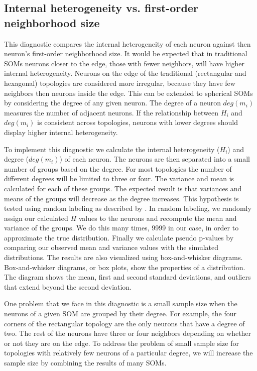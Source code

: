 \subsection{Internal heterogeneity vs. first-order neighborhood size}
\label{q1}
This diagnostic compares the internal heterogeneity of each neuron against
then neuron's first-order neighborhood size.  It would be expected that in
traditional SOMs neurons closer to the edge, those with fewer neighbors, will
have higher internal heterogeneity. Neurons on the edge of the traditional
(rectangular and hexagonal) topologies are considered more irregular, because
they have few neighbors then neurons inside the edge.  This can be extended to
spherical SOMs by considering the degree of any given neuron.  The degree of a
neuron $deg(m_i)$ measures the number of adjacent neurons.  If the
relationship between $H_i$ and $deg(m_i)$ is consistent across topologies,
neurons with lower degrees should display higher internal heterogeneity.

To implement this diagnostic we calculate the internal heterogeneity ($H_i$)
and degree ($deg(m_i)$) of each neuron. The neurons are then separated into a small number of
groups based on the degree.  For most topologies the number of
different degrees will be limited to three or four.  The variance and mean
is calculated for each of these groups.  The expected result is that
variances and means of the groups will decrease as the degree increases.  This
hypothesis is tested using random labeling as described by \cite{siss2004}.
In random labeling, we randomly assign our calculated $H$ values to the
neurons and recompute the mean and variance of the groups.  We do this many times,
9999 in our case, in order to approximate the true distribution. Finally we
calculate pseudo p-values by comparing our observed mean and variance values
with the simulated distributions.  The results are also visualized using
box-and-whisker diagrams. Box-and-whisker diagrams, or box plots, show the
properties of a distribution.  The diagram shows the mean, first and second
standard deviations, and outliers that extend beyond the second deviation.

One problem that we face in this diagnostic is a small sample size when the neurons of a given
SOM are grouped by their degree.  For example, the four corners of the
rectangular topology are the only neurons that have a degree of two.  The rest
of the neurons have three or four neighbors depending on whether or not they
are on the edge. To address the problem of small sample size for topologies
with relatively few neurons of a particular degree, we will increase
the sample size by combining the results of many SOMs.

